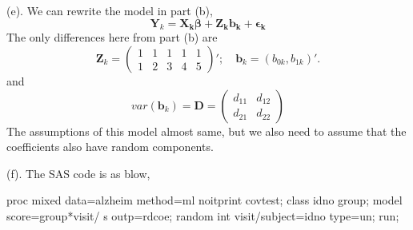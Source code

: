 \documentclass[letterpaper, 12pt]{article}
\newcommand{\lma}{\left(\begin{matrix}}
\newcommand{\rma}{\end{matrix}\right)}
\begin{document}
(e). We can rewrite the model in part (b),
$$
\bm{Y}_k=\bm{X_k\beta+Z_kb_k+\epsilon_k}
$$
The only differences here from part (b) are
$$
\bm{Z}_k=\lma 1&1&1&1&1\\1&2&3&4&5\rma';\quad
\bm{b}_k=(b_{0k},b_{1k})'.
$$
and
$$
var(\bm{b}_k)=\bm{D}=\lma d_{11} &d_{12}\\d_{21}&d_{22}\rma
$$
The assumptions of this model almost same, but we also need to assume that the coefficients also have random components.


(f). The SAS code is as blow,
\begin{Sascode}[store=class]
proc mixed data=alzheim method=ml noitprint covtest;
class idno group;
model score=group*visit/ s outp=rdcoe;
random int visit/subject=idno type=un;
run;
\end{Sascode}
\end{document}
